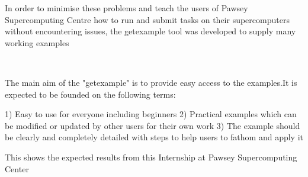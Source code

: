 \begin{Document}
{\begin{Introduction}
In order to minimise these problems and teach the users of Pawsey Supercomputing Centre  how to run and submit tasks on their supercomputers  without 
encountering issues, the getexample tool was developed to supply many working examples   




\end{Introduction}
\
\

The main aim of the "getexample" is to provide easy access to the examples.It is expected to be founded on the following terms:

1) Easy to use for everyone including beginners
2) Practical examples which can be modified or updated by other users for their own work
3) The example should be clearly and completely detailed with steps to help users to fathom and apply it

\Section{Scope}
\begin{scope}

This shows the expected results from this Internship at Pawsey Supercomputing Center
\
\



\end{scope}
\




}
\end{Document}
